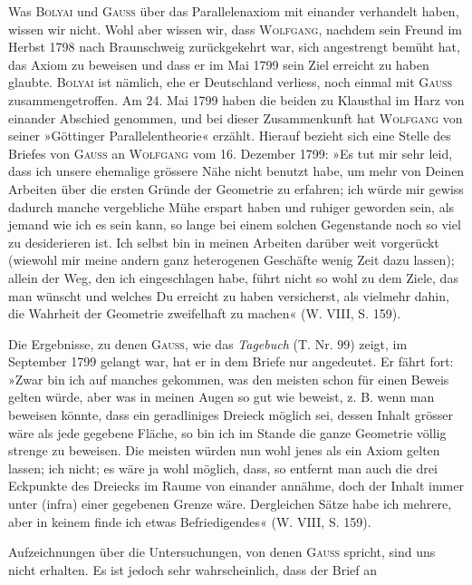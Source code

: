 \noindent\hspace*{\parindent}Was \textsc{Bolyai} und \textsc{Gauss} über das Parallelenaxiom mit einander verhandelt
haben, wissen wir nicht. Wohl aber wissen wir, dass \textsc{Wolfgang}, nachdem
sein Freund im Herbst 1798 nach Braunschweig zurückgekehrt war, sich angestrengt
bemüht hat, das Axiom zu beweisen und dass er im Mai 1799 sein
Ziel erreicht zu haben glaubte. \textsc{Bolyai} ist nämlich, ehe er Deutschland verliess,
noch einmal mit \textsc{Gauss} zusammengetroffen. Am 24. Mai 1799 haben
die beiden zu Klausthal im Harz von einander Abschied genommen, und bei
dieser Zusammenkunft hat \textsc{Wolfgang} von seiner »Göttinger Parallelentheorie«
erzählt. Hierauf bezieht sich eine Stelle des Briefes von \textsc{Gauss} an \textsc{Wolfgang}
vom 16. Dezember 1799: »Es tut mir sehr leid, dass ich unsere ehemalige
grössere Nähe nicht benutzt habe, um mehr von Deinen Arbeiten über die
ersten Gründe der Geometrie zu erfahren; ich würde mir gewiss dadurch
manche vergebliche Mühe erspart haben und ruhiger geworden sein, als jemand
wie ich es sein kann, so lange bei einem solchen Gegenstande noch so viel
zu desiderieren ist. Ich selbst bin in meinen Arbeiten darüber weit vorgerückt
(wiewohl mir meine andern ganz heterogenen Geschäfte wenig Zeit dazu
lassen); allein der Weg, den ich eingeschlagen habe, führt nicht so wohl zu
dem Ziele, das man wünscht und welches Du erreicht zu haben versicherst,
als vielmehr dahin, die Wahrheit der Geometrie zweifelhaft zu machen« (W.
VIII, S. 159).
\par
Die Ergebnisse, zu denen \textsc{Gauss}, wie das \textit{Tagebuch} (T. Nr. 99) zeigt, im
September 1799 gelangt war, hat er in dem Briefe nur angedeutet. Er fährt
fort: »Zwar bin ich auf manches gekommen, was den meisten schon für einen
Beweis gelten würde, aber was in meinen Augen so gut wie  beweist,
z. B. wenn man beweisen könnte, dass ein geradliniges Dreieck möglich sei,
dessen Inhalt grösser wäre als jede gegebene Fläche, so bin ich im Stande
die ganze Geometrie völlig strenge zu beweisen. Die meisten würden nun
wohl jenes als ein Axiom gelten lassen; ich nicht; es wäre ja wohl möglich,
dass, so entfernt man auch die drei Eckpunkte des Dreiecks im Raume von
einander annähme, doch der Inhalt immer unter (infra) einer gegebenen
Grenze wäre. Dergleichen Sätze habe ich mehrere, aber in keinem finde ich
etwas Befriedigendes« (W. VIII, S. 159).
\par
Aufzeichnungen über die Untersuchungen, von denen \textsc{Gauss} spricht, sind
uns nicht erhalten. Es ist jedoch sehr wahrscheinlich, dass der Brief an
